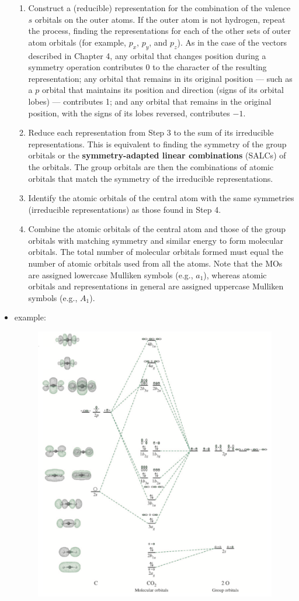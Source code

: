 \documentclass[../notes.tex]{subfiles}
\begin{document}
\begin{itemize}
\begin{enumerate}
        \item Construct a (reducible) representation for the combination of the valence $s$ orbitals on the outer atoms. If the outer atom is not hydrogen, repeat the process, finding the representations for each of the other sets of outer atom orbitals (for example, $p_x$, $p_y$, and $p_z$). As in the case of the vectors described in Chapter 4, any orbital that changes position during a symmetry operation contributes 0 to the character of the resulting representation; any orbital that remains in its original position --- such as a $p$ orbital that maintains its position and direction (signs of its orbital lobes) --- contributes 1; and any orbital that remains in the original position, with the signs of its lobes reversed, contributes $-1$.
        \item Reduce each representation from Step 3 to the sum of its irreducible representations. This is equivalent to finding the symmetry of the group orbitals or the \textbf{symmetry-adapted linear combinations} (SALCs) of the orbitals. The group orbitals are then the combinations of atomic orbitals that match the symmetry of the irreducible representations.
        \item Identify the atomic orbitals of the central atom with the same symmetries (irreducible representations) as those found in Step 4.
        \item Combine the atomic orbitals of the central atom and those of the group orbitals with matching symmetry and similar energy to form molecular orbitals. The total number of molecular orbitals formed must equal the number of atomic orbitals used from all the atoms. Note that the MOs are assigned lowercase Mulliken symbols (e.g., $a_1$), whereas atomic orbitals and representations in general are assigned uppercase Mulliken symbols (e.g., $A_1$).
    \end{enumerate}
    \item {} example:
    \begin{figure}[h!]
        \centering
        \includegraphics[width=0.8\linewidth]{../ExtFiles/molecularOrbitals-CO2.png}

\end{figure}
\end{itemize}
\end{document}
